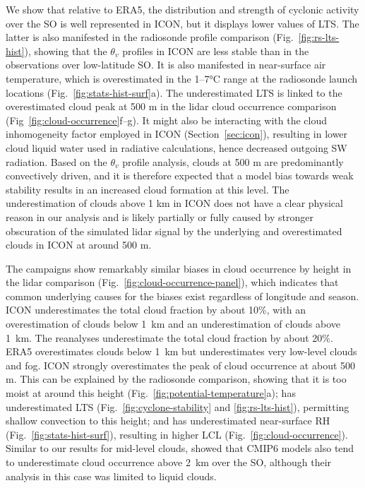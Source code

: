 \documentclass[draft]{agujournal2019}
\begin{document}
We show that relative to ERA5, the distribution and strength of cyclonic activity over the SO is well represented in ICON, but it displays lower values of LTS. The latter is also manifested in the radiosonde profile comparison (Fig.~\ref{fig:rs-lts-hist}), showing that the $\theta_v$ profiles in ICON are less stable than in the observations over low-latitude SO. It is also manifested in near-surface air temperature, which is overestimated in the 1–7°C range at the radiosonde launch locations (Fig.~\ref{fig:stats-hist-surf}a). The underestimated LTS is linked to the overestimated cloud peak at 500 m in the lidar cloud occurrence comparison (Fig~\ref{fig:cloud-occurrence}f–g). It might also be interacting with the cloud inhomogeneity factor employed in ICON (Section~\ref{sec:icon}), resulting in lower cloud liquid water used in radiative calculations, hence decreased outgoing SW radiation. Based on the $\theta_v$ profile analysis, clouds at 500 m are predominantly convectively driven, and it is therefore expected that a model bias towards weak stability results in an increased cloud formation at this level. The underestimation of clouds above 1 km in ICON does not have a clear physical reason in our analysis and is likely partially or fully caused by stronger obscuration of the simulated lidar signal by the underlying and overestimated clouds in ICON at around 500 m.

The campaigns show remarkably similar biases in cloud occurrence by height in the lidar comparison (Fig.~\ref{fig:cloud-occurrence-panel}), which indicates that common underlying causes for the biases exist regardless of longitude and season. ICON underestimates the total cloud fraction by about 10\%, with an overestimation of clouds below 1~km and an underestimation of clouds above 1~km. The reanalyses underestimate the total cloud fraction by about 20\%. ERA5 overestimates clouds below 1~km but underestimates very low-level clouds and fog. ICON strongly overestimates the peak of cloud occurrence at about 500 m. This can be explained by the radiosonde comparison, showing that it is too moist at around this height (Fig.~\ref{fig:potential-temperature}a); has underestimated LTS (Fig.~\ref{fig:cyclone-stability} and \ref{fig:rs-lts-hist}), permitting shallow convection to this height; and has underestimated near-surface RH (Fig.~\ref{fig:stats-hist-surf}), resulting in higher LCL (Fig.~\ref{fig:cloud-occurrence}). Similar to our results for mid-level clouds,  showed that CMIP6 models also tend to underestimate cloud occurrence above 2~km over the SO, although their analysis in this case was limited to liquid clouds.
\end{document}
